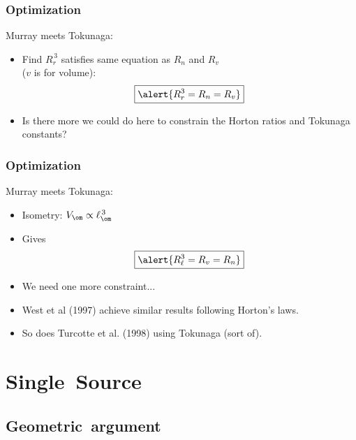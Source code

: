 \begin{frame}
  \frametitle{Optimization}

  \begin{block}{Murray meets Tokunaga:}
    \begin{itemize}
    \item<1-> 
      Find $R_r^{\, 3}$ satisfies same equation as $R_n$ and $R_v$\\
      ($v$ is for volume):
      $$
      \boxed{ \alert{R_r^3 = R_n = R_v} }
      $$
    \item<2->
      Is there more we could do here to constrain the Horton
      ratios and Tokunaga constants?
    \end{itemize}
  \end{block}

\end{frame}


\begin{frame}
  \frametitle{Optimization}

  \begin{block}{Murray meets Tokunaga:}
    \begin{itemize}
    \item<1-> 
      Isometry: $V_\om \propto \ell_\om^{\, 3}$
    \item<2->
      Gives 
      $$\boxed{\alert{R_\ell^3 = R_v = R_n}}$$
    \item<3-> 
      We need one more constraint...
    \item<4->
      West et al (1997)\cite{west1997a} achieve similar
      results following Horton's laws.
    \item<5->
      So does Turcotte et al. (1998)\cite{turcotte1998a}
      using Tokunaga (sort of).
    \end{itemize}
  \end{block}

\end{frame}


\section{Single\ Source}

\subsection{Geometric\ argument}

